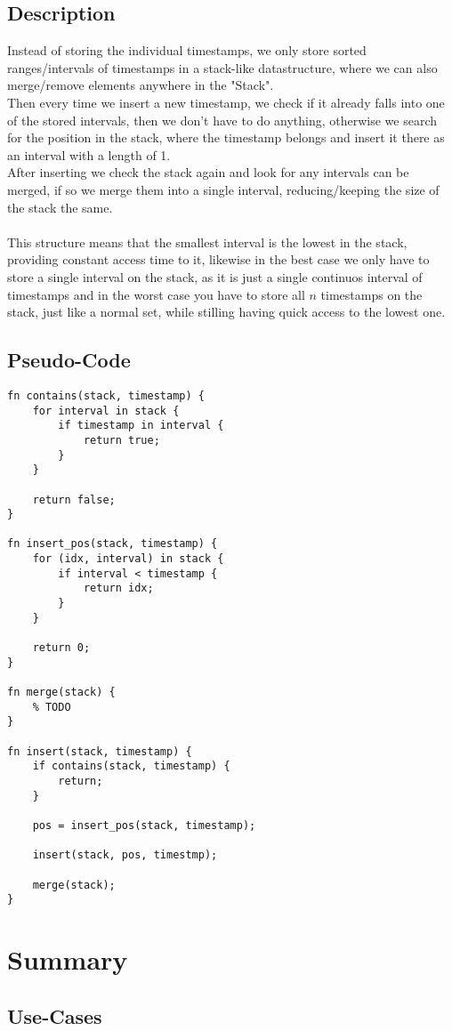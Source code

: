 \documentclass[a4paper, 11pt]{article}
\begin{document}
\subsection{Description}
Instead of storing the individual timestamps, we only store sorted ranges/intervals of timestamps in a stack-like
datastructure, where we can also merge/remove elements anywhere in the "Stack". \\
Then every time we insert a new timestamp, we check if it already falls into one of the stored intervals, then
we don't have to do anything, otherwise we search for the position in the stack, where the timestamp belongs and
insert it there as an interval with a length of 1. \\
After inserting we check the stack again and look for any intervals can be merged, if so we merge them into a single
interval, reducing/keeping the size of the stack the same. \\
\\
This structure means that the smallest interval is the lowest in the stack, providing constant access time to it,
likewise in the best case we only have to store a single interval on the stack, as it is just a single continuos
interval of timestamps and in the worst case you have to store all $n$ timestamps on the stack, just like a normal
set, while stilling having quick access to the lowest one.

\subsection{Pseudo-Code}
\begin{verbatim}
fn contains(stack, timestamp) {
	for interval in stack {
		if timestamp in interval {
			return true;
		}
	}

	return false;
}

fn insert_pos(stack, timestamp) {
	for (idx, interval) in stack {
		if interval < timestamp {
			return idx;
		}
	}

	return 0;
}

fn merge(stack) {
	% TODO
}

fn insert(stack, timestamp) {
	if contains(stack, timestamp) {
		return;
	}

	pos = insert_pos(stack, timestamp);

	insert(stack, pos, timestmp);

	merge(stack);
}
\end{verbatim}

\section{Summary}
\subsection{Use-Cases}
\end{document}
